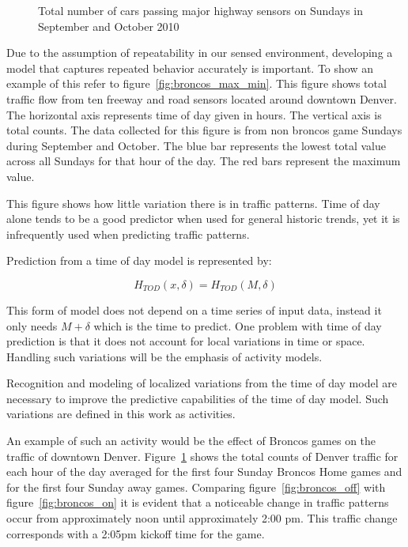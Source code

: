 \begin{figure}[ht]
\begin{center}
\end{center}
\caption{Total number of cars passing major highway sensors on Sundays in September and October 2010}
\label{fig:broncos}
\end{figure}

Due to the assumption of repeatability in our sensed environment, developing a model that captures repeated behavior accurately is important.  To show an example of this refer to figure~\ref{fig:broncos_max_min}.  This figure shows total traffic flow from ten freeway and road sensors located around downtown Denver.  The horizontal axis represents time of day given in hours.  The vertical axis is total counts.  The data collected for this figure is from non broncos game Sundays during September and October.  The blue bar represents the lowest total value across all Sundays for that hour of the day.  The red bars represent the maximum value.  

This figure shows how little variation there is in traffic patterns.   Time of day alone tends to be a good predictor \cite{kwon2000} when used for general historic trends, yet it is infrequently used when predicting traffic patterns.  

Prediction from a time of day model is represented by:

\begin{equation}
\label{eq:time_of_day}
H_{TOD}(x,\delta) = H_{TOD}(M, \delta)
\end{equation}

This form of model does not depend on a time series of input data, instead it only needs $M + \delta$ which is the time to predict.  One problem with time of day prediction is that it does not account for local variations in time or space.  Handling such variations will be the emphasis of activity models.

Recognition and modeling of localized variations from the time of day model are necessary to improve the predictive capabilities of the time of day model.  Such variations are defined in this work as activities.  

An example of such an activity would be the effect of Broncos games on the traffic of downtown Denver.  Figure~\ref{fig:broncos} shows the total counts of Denver traffic for each hour of the day averaged for the first four Sunday Broncos Home games and for the first four Sunday away games.  Comparing figure~\ref{fig:broncos_off} with figure~\ref{fig:broncos_on} it is evident that a noticeable change in traffic patterns occur from approximately noon until approximately 2:00 pm.  This traffic change corresponds with a 2:05pm kickoff time for the game.  

